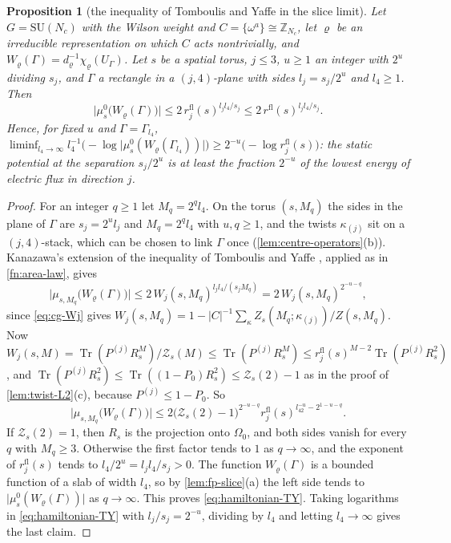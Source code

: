 \documentclass[11pt,a4paper]{amsart}
\newtheorem{proposition}[theorem]{Proposition}
\theoremstyle{definition}
\theoremstyle{remark}
\numberwithin{equation}{section}
\DeclareMathOperator{\Tr}{Tr}        %
\newcommand{\Z}{\mathbb{Z}}          %
\newcommand{\abs}[1]{\lvert #1\rvert}      %
\newcommand{\SU}{\mathrm{SU}}              %
\newcommand{\TT}{\mathbb{T}}               %
\newcommand{\Zpart}[2]{Z(#1,#2)}           %
\newcommand{\Zc}{\mathcal{Z}}              %
\newcommand{\Zs}[2]{\Zc_{#1}(#2)}          %
\newcommand{\Omegazero}{\Omega_0}          %
\begin{document}
\begin{proposition}[the inequality of Tomboulis and Yaffe in the slice limit]\label{prop:hamiltonian-TY}
Let $G=\SU(N_c)$ with the Wilson weight and $C=\{\omega^a\}\cong\Z_{N_c}$, let $\varrho$ be an irreducible representation on which $C$ acts nontrivially, and $W_\varrho(\Gamma)=d_\varrho^{-1}\chi_\varrho(U_\Gamma)$. Let $s$ be a spatial torus, $j\le3$, $u\ge1$ an integer with $2^u$ dividing $s_j$, and $\Gamma$ a rectangle in a $(j,4)$-plane with sides $l_j=s_j/2^u$ and $l_4\ge1$. Then
\begin{equation}\label{eq:hamiltonian-TY}
\abs{\mu^0_s\bigl(W_\varrho(\Gamma)\bigr)}\le2\,r^{\mathrm{fl}}_j(s)^{l_jl_4/s_j}\le2\,r^{\mathrm{fl}}(s)^{l_jl_4/s_j}.
\end{equation}
Hence, for fixed $u$ and $\Gamma=\Gamma_{l_4}$, $\liminf_{l_4\to\infty}l_4^{-1}\bigl(-\log\abs{\mu^0_s(W_\varrho(\Gamma_{l_4}))}\bigr)\ge2^{-u}\bigl(-\log r^{\mathrm{fl}}_j(s)\bigr)$: the static potential at the separation $s_j/2^u$ is at least the fraction $2^{-u}$ of the lowest energy of electric flux in direction $j$.
\end{proposition}

\begin{proof}
For an integer $q\ge1$ let $M_q=2^ql_4$. On the torus $(s,M_q)$ the sides in the plane of $\Gamma$ are $s_j=2^ul_j$ and $M_q=2^ql_4$ with $u,q\ge1$, and the twists $\kappa_{(j)}$ sit on a $(j,4)$-stack, which can be chosen to link $\Gamma$ once (\cref{lem:centre-operators}\textup{(b)}). Kanazawa's extension \cite[Theorem~2, eq.~(27)]{kanazawa2009} of the inequality of Tomboulis and Yaffe \cite{tomboulis1985}, applied as in \cref{fn:area-law}, gives
\[
\abs{\mu_{s,M_q}\bigl(W_\varrho(\Gamma)\bigr)}\le2\,W_j(s,M_q)^{l_jl_4/(s_jM_q)}=2\,W_j(s,M_q)^{2^{-u-q}},
\]
since \eqref{eq:cg-Wj} gives $W_j(s,M_q)=1-\abs{C}^{-1}\sum_\kappa Z_s(M_q;\kappa_{(j)})/\Zpart{s}{M_q}$. Now $W_j(s,M)=\Tr(P^{(j)}R_s^M)/\Zs{s}{M}\le\Tr(P^{(j)}R_s^M)\le r^{\mathrm{fl}}_j(s)^{M-2}\Tr(P^{(j)}R_s^2)$, and $\Tr(P^{(j)}R_s^2)\le\Tr((1-P_0)R_s^2)\le\Zs{s}{2}-1$ as in the proof of \cref{lem:twist-L2}\textup{(c)}, because $P^{(j)}\le1-P_0$. So
\[
\abs{\mu_{s,M_q}\bigl(W_\varrho(\Gamma)\bigr)}\le2\bigl(\Zs{s}{2}-1\bigr)^{2^{-u-q}}r^{\mathrm{fl}}_j(s)^{l_42^{-u}-2^{1-u-q}} .
\]
If $\Zs{s}{2}=1$, then $R_s$ is the projection onto $\Omegazero$, and both sides vanish for every $q$ with $M_q\ge3$. Otherwise the first factor tends to $1$ as $q\to\infty$, and the exponent of $r^{\mathrm{fl}}_j(s)$ tends to $l_4/2^u=l_jl_4/s_j>0$. The function $W_\varrho(\Gamma)$ is a bounded function of a slab of width $l_4$, so by \cref{lem:fp-slice}\textup{(a)} the left side tends to $\abs{\mu^0_s(W_\varrho(\Gamma))}$ as $q\to\infty$. This proves \eqref{eq:hamiltonian-TY}. Taking logarithms in \eqref{eq:hamiltonian-TY} with $l_j/s_j=2^{-u}$, dividing by $l_4$ and letting $l_4\to\infty$ gives the last claim.
\end{proof}
\end{document}
